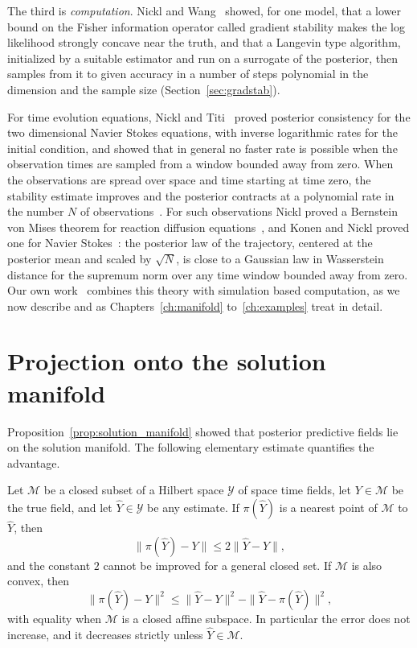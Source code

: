 The third is \emph{computation}. Nickl and Wang~\cite{nicklwang2024} showed, for one model, that a lower bound on the Fisher information operator called gradient stability makes the log likelihood strongly concave near the truth, and that a Langevin type algorithm, initialized by a suitable estimator and run on a surrogate of the posterior, then samples from it to given accuracy in a number of steps polynomial in the dimension and the sample size (Section~\ref{sec:gradstab}).

For time evolution equations, Nickl and Titi~\cite{nickltiti2024} proved posterior consistency for the two dimensional Navier Stokes equations, with inverse logarithmic rates for the initial condition, and showed that in general no faster rate is possible when the observation times are sampled from a window bounded away from zero. When the observations are spread over space and time starting at time zero, the stability estimate improves and the posterior contracts at a polynomial rate in the number $N$ of observations~\cite{konennickl2026}. For such observations Nickl proved a Bernstein von Mises theorem for reaction diffusion equations~\cite{nicklbvm2024}, and Konen and Nickl proved one for Navier Stokes~\cite{konennickl2026}: the posterior law of the trajectory, centered at the posterior mean and scaled by $\sqrt N$, is close to a Gaussian law in Wasserstein distance for the supremum norm over any time window bounded away from zero. Our own work~\cite{polsonsokolov2026manifold} combines this theory with simulation based computation, as we now describe and as Chapters~\ref{ch:manifold} to~\ref{ch:examples} treat in detail.



\section{Projection onto the solution manifold}

Proposition~\ref{prop:solution_manifold} showed that posterior predictive fields lie on the solution manifold. The following elementary estimate quantifies the advantage.

\begin{proposition}[Projection]
\label{prop:projection_manifold}
Let $\mathcal{M}$ be a closed subset of a Hilbert space $\mathcal{Y}$ of space time fields, let $Y\in\mathcal{M}$ be the true field, and let $\hat Y\in\mathcal{Y}$ be any estimate. If $\pi(\hat Y)$ is a nearest point of $\mathcal{M}$ to $\hat Y$, then
\[
\|\pi(\hat Y)-Y\|\leq2\|\hat Y-Y\|,
\]
and the constant $2$ cannot be improved for a general closed set. If $\mathcal{M}$ is also convex, then
\[
\|\pi(\hat Y)-Y\|^2\leq\|\hat Y-Y\|^2-\|\hat Y-\pi(\hat Y)\|^2,
\]
with equality when $\mathcal{M}$ is a closed affine subspace. In particular the error does not increase, and it decreases strictly unless $\hat Y\in\mathcal{M}$.
\end{proposition}

